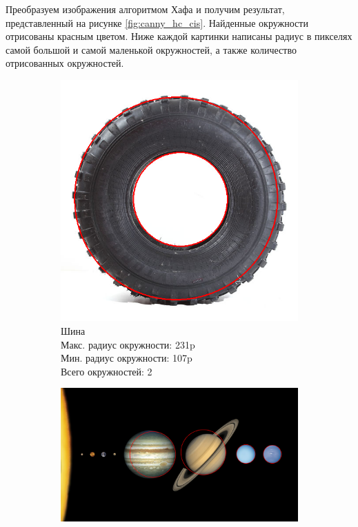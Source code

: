 \documentclass[a4paper, 16pt]{article}
\begin{document}
    \noindent Преобразуем изображения алгоритмом Хафа и получим результат, представленный на рисунке \ref{fig:canny_hc_cis}.
    Найденные окружности отрисованы красным цветом. Ниже каждой картинки написаны радиус в пикселях самой большой и самой маленькой окружностей,
    а также количество отрисованных окружностей.
    \begin{figure}[htbp]
        \centering
        \begin{subfigure}{0.3\textwidth}
            \centering
            \includegraphics[scale=0.15]{canny_hc_ci1.png}
            \caption{Шина\\Макс. радиус окружности: 231p\\Мин. радиус окружности: 107p\\Всего окружностей: 2}
            \label{fig:canny_hc_ci1}
        \end{subfigure}
        \hfill
        \begin{subfigure}{0.3\textwidth}
            \centering
            \includegraphics[width=\linewidth]{canny_hc_ci2.png}

\end{subfigure}
\end{figure}
\end{document}
